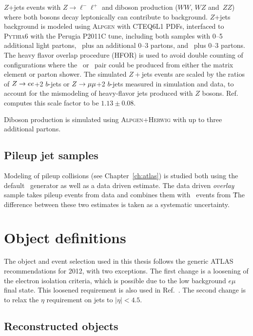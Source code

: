 $Z$+jets events with $Z\rightarrow \ell^-\ell^+$ and diboson production ($WW$, $WZ$ and~$ZZ$) where both bosons decay leptonically can contribute to background. $Z$+jets background is modeled using \textsc{  Alpgen} \cite{Mangano:2002ea} with CTEQ6L1 PDFs, interfaced to \textsc{  Pythia6} with the Perugia P2011C tune, including both samples with 0--5 additional light partons, 
\ccbar\ plus an additional 0--3 partons, and \bbbar\
plus 0--3 partons. The heavy flavor overlap procedure (HFOR) \cite{hfor} is used to avoid double counting of configurations where the \ccbar\ or \bbbar\ pair could be produced from either the matrix element or parton shower. The simulated $Z+$jets  events are scaled by the ratios of $Z\rightarrow ee$+2 $b$-jets or $Z\rightarrow \mu\mu$+2 $b$-jets measured in simulation and data, to account for the mismodeling of heavy-flavor jets produced with $Z$ bosons. Ref.~\cite{xsec} computes this scale factor to be $1.13 \pm 0.08$. 

Diboson production is simulated using \textsc{  Alpgen+Herwig} with up to three additional partons.

\subsection{Pileup jet samples}
Modeling of pileup collisions (see Chapter~\ref{ch:atlas}) is studied both using the default \powpy\ generator as well as a data driven estimate. The data driven \emph{overlay} sample takes pileup events from data and combines them with \ttbar\ events from \powpy\. The difference between these two estimates is taken as a systematic uncertainty.
\section{Object definitions}
The object and event selection used in this thesis follows the generic ATLAS recommendations for 2012, with two exceptions.  The first change is a loosening of the electron isolation criteria, which is possible due to the low background  $e\mu$ final state. This loosened requirement is also used in Ref.~\cite{xsec}. The second change is to relax the $\eta$ requirement on  jets to $|\eta|<4.5$.

\subsection{Reconstructed objects}\label{s:objects}

